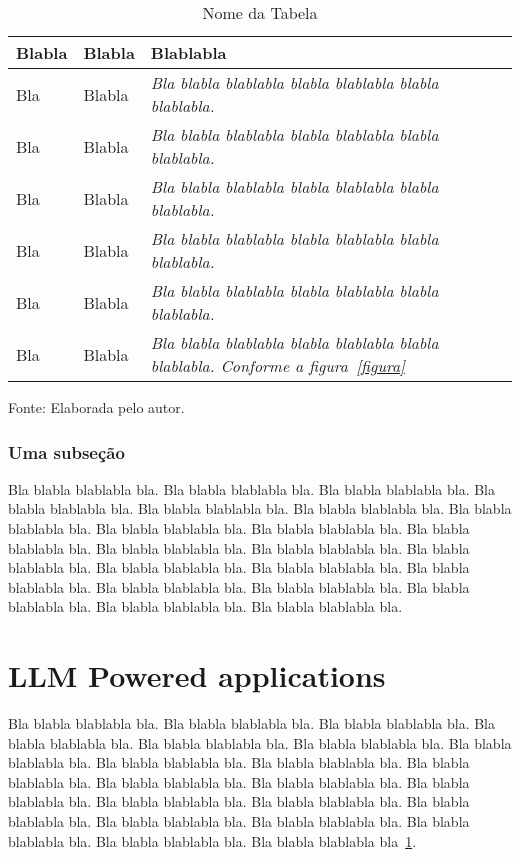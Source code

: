 \documentclass[tcc,capa]{texufpel}
\begin{document}
\begin{table}
\caption{Nome da Tabela}\label{tabela2}
\centering\begin{tabular}{p{4cm}p{5cm}p{6cm}}
\hline
Blabla & Blabla & Blablabla\\
\hline
{\small Bla} & {\small Blabla} & {\small\em Bla blabla blablabla blabla
  blablabla blabla blablabla.}\\
{\small Bla} & {\small Blabla} & {\small\em Bla blabla blablabla blabla
  blablabla blabla blablabla.}\\
{\small Bla} & {\small Blabla} & {\small\em Bla blabla blablabla blabla
  blablabla blabla blablabla.}\\
{\small Bla} & {\small Blabla} & {\small\em Bla blabla blablabla blabla
  blablabla blabla blablabla.}\\
{\small Bla} & {\small Blabla} & {\small\em Bla blabla blablabla blabla
  blablabla blabla blablabla.}\\
{\small Bla} & {\small Blabla} & {\small\em Bla blabla blablabla blabla
  blablabla blabla blablabla. Conforme a figura~\ref{figura}}\\
\hline
\end{tabular}
\begin{flushleft}
{\small Fonte: Elaborada pelo autor.}    
\end{flushleft}
\end{table}


\subsection{Uma subseção}

Bla blabla blablabla bla.  Bla blabla blablabla bla.  Bla blabla
blablabla bla.  Bla blabla blablabla bla.  Bla blabla blablabla bla.
Bla blabla blablabla bla.  Bla blabla blablabla bla.  Bla blabla
blablabla bla.  Bla blabla blablabla bla.  Bla blabla blablabla bla.
Bla blabla blablabla bla.  Bla blabla blablabla bla.  Bla blabla
blablabla bla.  Bla blabla blablabla bla.  Bla blabla blablabla bla.
Bla blabla blablabla bla.  Bla blabla blablabla bla.  Bla blabla
blablabla bla.  Bla blabla blablabla bla.  Bla blabla blablabla bla.
Bla blabla blablabla bla.

\chapter{LLM Powered applications}

Bla blabla blablabla bla.  Bla blabla blablabla bla.  Bla blabla
blablabla bla.  Bla blabla blablabla bla.  Bla blabla blablabla bla.
Bla blabla blablabla bla.  Bla blabla blablabla bla.  Bla blabla
blablabla bla.  Bla blabla blablabla bla.  Bla blabla blablabla bla.
Bla blabla blablabla bla.  Bla blabla blablabla bla.  Bla blabla
blablabla bla.  Bla blabla blablabla bla.  Bla blabla blablabla bla.
Bla blabla blablabla bla.  Bla blabla blablabla bla.  Bla blabla
blablabla bla.  Bla blabla blablabla bla.  Bla blabla blablabla bla.
Bla blabla blablabla bla~\ref{tabela2}.
\end{document}
